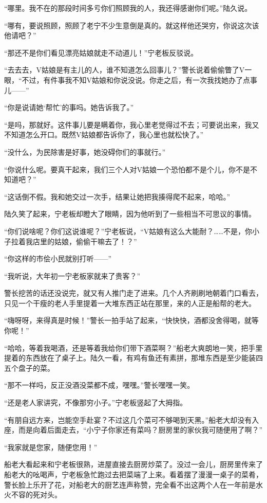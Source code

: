 “哪里。我不在的那段时间多亏你们照顾我的人，我还得感谢你们呢。”陆久说。

“哪有，要说照顾，照顾了老宁不少生意倒是真的。就这样他还哭穷，你说这次该他请吧？”

“那还不是你们看见漂亮姑娘就走不动道儿！”宁老板反驳说。

“去去去，V姑娘是有主儿的人，谁不知道怎么回事儿？”警长说着偷偷瞥了V一眼，“不过，有件事我不知V姑娘和你说没说。你走之后，有一次我找她办了点事儿——”

“你是说请她‘帮忙’的事吗。她告诉我了。”

“是吗，那就好。这件事儿要是瞒着你，我心里老觉得过不去；可要说出来，我又不知道怎么开口。既然V姑娘都告诉你了，我心里也就松快了。”

“没什么，为民除害是好事，她没碍你们的事就行。”

“你说什么呢。要真干起来，我们三个人对V姑娘一个恐怕都不是个儿，你不是不知道吧？”

“这话倒不假。我和她交过一次手，结果让她把我揍得爬不起来，哈哈。”

陆久笑了起来，宁老板却瞪大了眼睛，因为他听到了一些相当不可思议的事情。

“你们说啥呢？你们这说谁呢？”宁老板说，“V姑娘有这么大能耐？……不是，你小子拉着我店里的姑娘，偷偷干嘛去了！？”

“你这样的市侩小民就别打听——”

“我听说，大年初一宁老板家就来了贵客？”

警长挖苦的话还没说完，就又有人推门走了进来。几个人齐刷刷地朝着门口看去，只见一个干瘦的老人手里提着一大堆东西正站在那里，来的人正是船帮的老大。

“嗨呀呀，来得真是时候！”警长一拍手站了起来，“快快快，酒都没舍得喝，就等你呢！”

“哈哈，等着我喝酒，还是等着我给你们带下酒菜啊？”船老大爽朗地一笑，把手里提着的东西放在了桌子上。陆久一看，有鸡有鱼还有素拼，那堆东西是至少能装四五个盘子的菜。

“那不一样吗，反正没酒没菜都不成，嘿嘿。”警长嘿嘿一笑。

“还是老人家讲究，不像那穷小子。”宁老板竖起了大拇指。

“有朋自远方来，岂能空手赴宴？不过这几个菜可不够喝到天黑。”船老大却没有入座，而是向着后面走去，“小宁子你家还有菜吗？厨房里的家伙我可随便用了啊？”

“我家就是您家，随便您用！”

船老大看起来和宁老板很熟，进屋直接去厨房炒菜了。没过一会儿，厨房里传来了船老大的吆喝声，宁老板急忙跑过去把菜端了上来。看着摆了漫漫一桌子的菜肴，警长脸上乐开了花，对船老大的厨艺连声称赞，完全看不出这两个人在一年前是水火不容的死对头。

